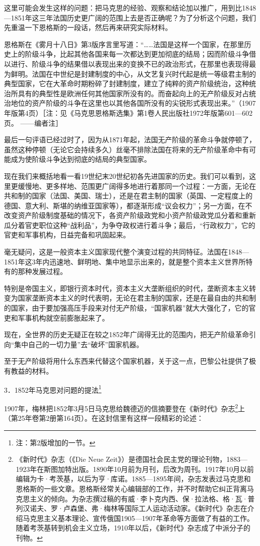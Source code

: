 \documentclass[UTF8, 12pt, a4paper]{ctexrep}
\begin{document}
这里可能会发生这样的问题：把马克思的经验、观察和结论加以推广，用到比1848—1851年这三年法国历史更广阔的范围上去是否正确呢？为了分析这个问题，我们先重温一下恩格斯的一段话，然后再来研究实际材料。

恩格斯在《雾月十八日》第3版序言里写道：“……法国是这样一个国家，在那里历史上的阶级斗争，比起其他各国来每一次都达到更加彻底的结局；因而阶级斗争借以进行、阶级斗争的结果借以表现出来的变换不已的政治形式，在那里也表现得最为鲜明。法国在中世纪是封建制度的中心，从文艺复兴时代起是统一等级君主制的典型国家，它在大革命时期粉碎了封建制度，建立了纯粹的资产阶级统治，这种统治所具有的典型性是欧洲任何其他国家所没有的。而奋起向上的无产阶级反对占统治地位的资产阶级的斗争在这里也以其他各国所没有的尖锐形式表现出来。”（1907年版第4页）［注：见《马克思恩格斯选集》第1卷人民出版社1972年版第601—602页。 ——编者注］

最后一句评语已经过时了，因为从1871年起，法国无产阶级的革命斗争就停顿了，虽然这种停顿（无论它会持续多久）丝毫不排除法国在将来的无产阶级革命中有可能成为使阶级斗争达到彻底的结局的典型国家。

现在我们来概括地看一看19世纪末20世纪初各先进国家的历史。我们可以看到，这里更缓慢地、更多样地、范围更广阔得多地进行着那同一个过程：一方面，无论在共和制的国家（法国、美国、瑞士），还是在君主制的国家（英国、一定程度上的德国、意大利、斯堪的纳维亚国家等），都逐渐形成“议会权力”；另一方面，在不改变资产阶级制度基础的情况下，各资产阶级政党和小资产阶级政党瓜分着和重新瓜分着官吏职位这种“战利品”，为争夺政权进行着斗争；最后，“行政权力”，它的官吏和军事机构，日益完备和巩固起来。

毫无疑问，这是一般资本主义国家现代整个演变过程的共同特征。法国在1848—1851年这3年内迅速地、鲜明地、集中地显示出来的，就是整个资本主义世界所特有的那种发展过程。　

特别是帝国主义，即银行资本时代，资本主义大垄断组织的时代，垄断资本主义转变为国家垄断资本主义的时代表明，无论在君主制的国家，还是在最自由的共和制的国家，由于要加强高压手段来对付无产阶级，“国家机器”就大大强化了，它的官吏和军事机构就空前膨胀起来了。

现在，全世界的历史无疑正在较之1852年广阔得无比的范围内，把无产阶级革命引向“集中自己的一切力量”去“破坏”国家机器。

至于无产阶级将用什么东西来代替这个国家机器，关于这一点，巴黎公社提供了极有教益的材料。

3．1852年马克思对问题的提法\footnote{注：第2版增加的一节。}

1907年，梅林把1852年3月5日马克思给魏德迈的信摘要登在《新时代》杂志\footnote{《新时代》杂志（《Die Neue Zeit》）是德国社会民主党的理论刊物，1883—1923年在斯图加特出版。1890年10月前为月刊，后改为周刊。1917年10月以前编辑为卡·考茨基，以后为亨·库诺。1885—1895年间，杂志发表过马克思和恩格斯的一些文章。恩格斯经常关心编辑部的工作，并不时帮助它纠正背离马克思主义的倾向。为杂志撰过稿的有威·李卜克内西、保·拉法格、格·瓦·普列汉诺夫、罗·卢森堡、弗·梅林等国际工人运动活动家。《新时代》杂志在介绍马克思主义基本理论、宣传俄国1905—1907年革命等方面做了有益的工作。随着考茨基转到机会主义立场，1910年以后，《新时代》杂志成了中派分子的刊物。}上（第25年卷第2册第164页）。在这封信里有这样一段精彩的论述：
\end{document}
